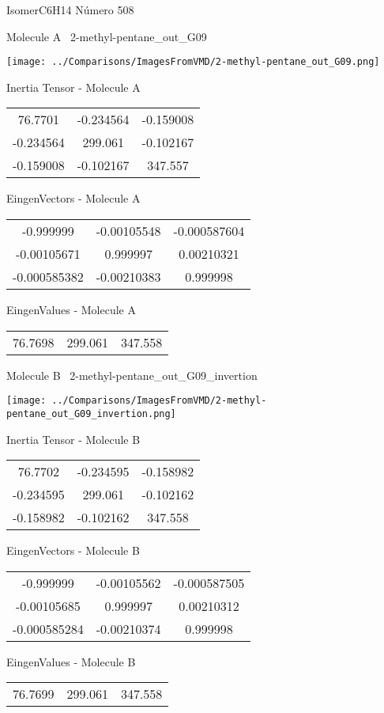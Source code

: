 \vtab[-3cm]
\begin{center}
{\large IsomerC6H14 \tab Número 508}
\end{center}
\begin{multicols}{2}
\begin{center}

Molecule A \
2-methyl-pentane\_out\_G09

\texttt{[image: ../Comparisons/ImagesFromVMD/2-methyl-pentane\_out\_G09.png]}

Inertia Tensor - Molecule A \\
\begin{tabular}{|c c c|}
76.7701	 & 	-0.234564	 & 	-0.159008	 \\
-0.234564	 & 	299.061	 & 	-0.102167	 \\
-0.159008	 & 	-0.102167	 & 	347.557
\end{tabular}

\vtab
 EingenVectors - Molecule A     \\
\begin{tabular}{|c c c|}
-0.999999	 & 	-0.00105548	 & 	-0.000587604	 \\
-0.00105671	 & 	0.999997	 & 	0.00210321	 \\
-0.000585382	 & 	-0.00210383	 & 	0.999998
\end{tabular}

\vtab
 EingenValues - Molecule A     \\
\begin{tabular}{|c c c|}
76.7698	 & 	299.061	 & 	347.558	 \\
\end{tabular}
\columnbreak

Molecule B \
2-methyl-pentane\_out\_G09\_invertion

\texttt{[image: ../Comparisons/ImagesFromVMD/2-methyl-pentane\_out\_G09\_invertion.png]}

Inertia Tensor - Molecule B \\
\begin{tabular}{|c c c|}
76.7702	 & 	-0.234595	 & 	-0.158982	 \\
-0.234595	 & 	299.061	 & 	-0.102162	 \\
-0.158982	 & 	-0.102162	 & 	347.558
\end{tabular}

\vtab
 EingenVectors - Molecule B     \\
\begin{tabular}{|c c c|}
-0.999999	 & 	-0.00105562	 & 	-0.000587505	 \\
-0.00105685	 & 	0.999997	 & 	0.00210312	 \\
-0.000585284	 & 	-0.00210374	 & 	0.999998
\end{tabular}

\vtab
 EingenValues - Molecule B     \\
\begin{tabular}{|c c c|}
76.7699	 & 	299.061	 & 	347.558	 \\
\end{tabular}

\end{center}
\end{multicols}

